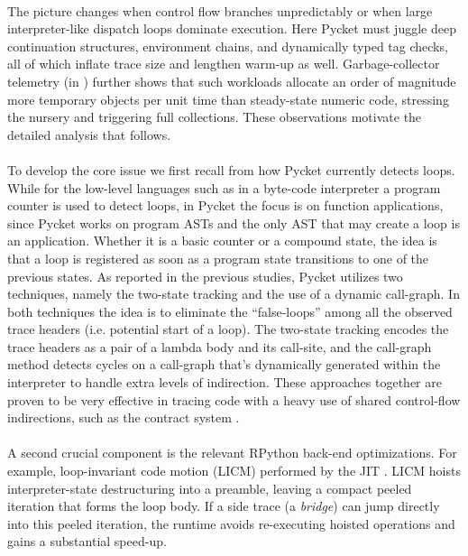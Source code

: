 	\paragraph{}%
		The picture changes when control flow branches unpredictably or when large interpreter-like dispatch loops dominate execution. Here Pycket must juggle deep continuation structures, environment chains, and dynamically typed tag checks, all of which inflate trace size and lengthen warm-up as well. Garbage-collector telemetry (in ) further shows that such workloads allocate an order of magnitude more temporary objects per unit time than steady-state numeric code, stressing the nursery and triggering full collections. These observations motivate the detailed analysis that follows.

	\paragraph{}%
		To develop the core issue we first recall from  how Pycket currently detects loops. While for the low-level languages such as in a byte-code interpreter a program counter is used to detect loops, in Pycket the focus is on function applications, since Pycket works on program ASTs and the only AST that may create a loop is an application. Whether it is a basic counter or a compound state, the idea is that a loop is registered as soon as a program state transitions to one of the previous states. As reported in the previous studies, Pycket utilizes two techniques, namely the two-state tracking and the use of a dynamic call-graph. In both techniques the idea is to eliminate the “false-loops” among all the observed trace headers (i.e. potential start of a loop). The two-state tracking encodes the trace headers as a pair of a lambda body and its call-site, and the call-graph method detects cycles on a call-graph that's dynamically generated within the interpreter to handle extra levels of indirection. These approaches together are proven to be very effective in tracing code with a heavy use of shared control-flow indirections, such as the contract system \cite{pycketmain,pycketmain2}.

	\paragraph{}%
		A second crucial component is the relevant RPython back-end optimizations. For example, loop-invariant code motion (LICM) performed by the JIT \cite{loop-aware:12}. LICM hoists interpreter-state destructuring into a preamble, leaving a compact peeled iteration that forms the loop body. If a side trace (a \emph{bridge}) can jump directly into this peeled iteration, the runtime avoids re-executing hoisted operations and gains a substantial speed-up.


